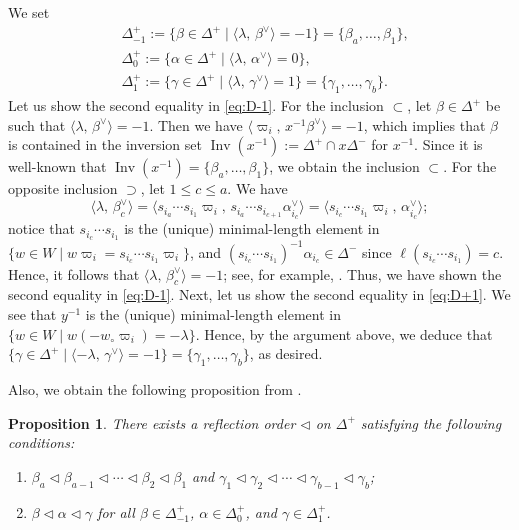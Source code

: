 \documentclass[11pt,a4paper,reqno,dvipdfmx]{amsart}
\numberwithin{equation}{section}
\newcommand{\vpi}{\varpi}
\DeclareMathOperator{\Inv}{Inv}
\newcommand{\lng}{w_{\circ}}
\newcommand{\pair}[2]{\langle #1,\,#2 \rangle}
\theoremstyle{plain}
\newtheorem{prop}[lem]{Proposition}
\theoremstyle{definition}
\theoremstyle{remark}
\newenvironment{enu}{%
 \begin{enumerate}%
 \renewcommand{\labelenumi}{\rm (\theenumi)}%
}{\end{enumerate}}
\begin{document}
We set 
%
\begin{align}
& \Delta_{-1}^{+}:=\bigl\{ \beta \in \Delta^{+} \mid 
\pair{\lambda}{\beta^{\vee}} = -1 \bigr\} = \bigl\{ \beta_{a},\dots,\beta_{1} \bigr\}, \label{eq:D-1} \\
%
& \Delta_{0}^{+}:=\bigl\{ \alpha \in \Delta^{+} \mid 
\pair{\lambda}{\alpha^{\vee}} = 0 \bigr\}, \\
%
& \Delta_{1}^{+}:=\bigl\{ \gamma \in \Delta^{+} \mid 
\pair{\lambda}{\gamma^{\vee}} = 1 \bigr\} = \bigl\{ \gamma_{1},\dots,\gamma_{b} \bigr\}. \label{eq:D+1}
\end{align}
%
Let us show the second equality in \eqref{eq:D-1}. 
For the inclusion $\subset$, let $\beta \in \Delta^{+}$ be such that $\pair{\lambda}{\beta^{\vee}} = -1$. 
Then we have $\pair{\vpi_{i}}{x^{-1}\beta^{\vee}} = -1$, which implies that $\beta$ is contained in the 
inversion set $\Inv (x^{-1}) := \Delta^{+} \cap x \Delta^{-}$ for $x^{-1}$. 
Since it is well-known that $\Inv (x^{-1}) = \bigl\{ \beta_{a},\dots,\beta_{1} \bigr\}$, 
we obtain the inclusion $\subset$. For the opposite inclusion $\supset$, 
let $1 \le c \le a$. We have 
%
\begin{equation*}
\pair{\lambda}{\beta_{c}^{\vee}} = 
\pair{ s_{i_a} \cdots s_{i_1}\vpi_{i} }{ s_{i_{a}} \cdots s_{i_{c+1}}\alpha_{i_{c}}^{\vee} } = 
\pair{ s_{i_c} \cdots s_{i_1}\vpi_{i} }{ \alpha_{i_{c}}^{\vee} }; 
\end{equation*}
%
notice that $s_{i_c} \cdots s_{i_1}$ is the (unique) minimal-length element in 
$\bigl\{ w \in W \mid w \vpi_{i} = s_{i_c} \cdots s_{i_1} \vpi_{i} \bigr\}$, 
and $(s_{i_c} \cdots s_{i_1})^{-1}\alpha_{i_c} \in \Delta^{-}$ since 
$\ell(s_{i_c} \cdots s_{i_1}) = c$. Hence, it follows that 
$\pair{\lambda}{\beta_{c}^{\vee}} = -1$; see, for example, \cite[Proposition 5.1]{LNSSS1}. 
Thus, we have shown the second equality in \eqref{eq:D-1}. 
Next, let us show the second equality in \eqref{eq:D+1}. We see that 
$y^{-1}$ is the (unique) minimal-length element in 
$\bigl\{ w \in W \mid w (-\lng \vpi_{i}) = - \lambda \bigr\}$. Hence, by the argument above, 
we deduce that $\bigl\{ \gamma \in \Delta^{+} \mid 
\pair{-\lambda}{\gamma^{\vee}} = -1 \bigr\} = \bigl\{ \gamma_{1},\dots,\gamma_{b} \bigr\}$, as desired. 

Also, we obtain the following proposition 
from \cite[Proposition 2.12 and Remark 2.13]{KN}. 
%
%
\begin{prop} \label{prop:ref-chain}
There exists a reflection order $\lhd$ on $\Delta^{+}$ 
satisfying the following conditions{\rm :} 
%
\begin{enu}
\item $\beta_{a} \lhd \beta_{a-1} \lhd  \cdots \lhd \beta_{2} \lhd \beta_{1}$ 
and $\gamma_{1} \lhd \gamma_{2} \lhd \cdots \lhd \gamma_{b-1} \lhd \gamma_{b}${\rm ;} 
%
\item $\beta \lhd \alpha \lhd \gamma$ for all $\beta \in \Delta_{-1}^{+}$, 
$\alpha \in \Delta_{0}^{+}$, and $\gamma \in \Delta_{1}^{+}$. 
\end{enu}
%
\end{prop}
\end{document}
